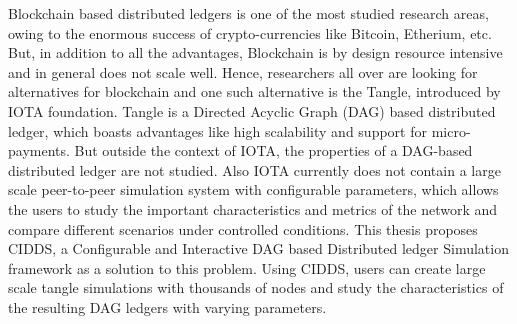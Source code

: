 Blockchain based distributed ledgers is one of the most studied research areas, owing to the enormous success of crypto-currencies like Bitcoin, Etherium, etc. But, in addition to all the advantages, Blockchain is by design resource intensive and in general does not scale well. Hence, researchers all over are looking for alternatives for blockchain and one such alternative is the Tangle, introduced by IOTA foundation. Tangle is a Directed Acyclic Graph (DAG) based distributed ledger, which boasts advantages like high scalability and support for micro-payments. But outside the context of IOTA, the properties of a DAG-based distributed ledger are not studied. Also IOTA currently does not contain a large scale peer-to-peer simulation system with configurable parameters, which allows the users to study the important characteristics and metrics of the network and compare different scenarios under controlled conditions. This thesis proposes CIDDS, a Configurable and Interactive DAG based Distributed ledger Simulation framework as a solution to this problem. Using CIDDS, users can create large scale tangle simulations with thousands of nodes and study the characteristics of the resulting DAG ledgers with varying parameters.
